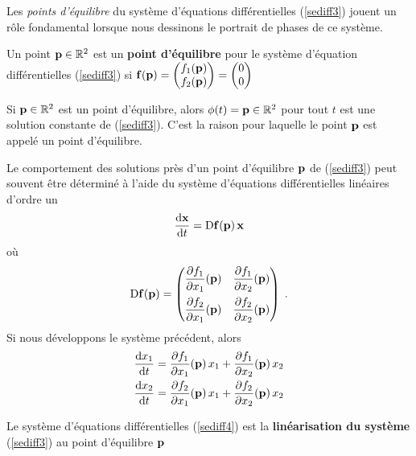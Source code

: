 {Les {\em points d'équilibre} du système d'équations différentielles
(\ref{sediff3}) jouent un rôle fondamental lorsque nous dessinons le
portrait de phases de ce système.

\begin{defn}
Un point $\mathbf{p} \in \mathbb{R}^2$ est un {\bfseries point
d'équilibre} pour le système d'équation différentielles (\ref{sediff3}) si
$\displaystyle \mathbf{f}(\mathbf{p}) =
\begin{pmatrix}
f_1(\mathbf{p}) \\ f_2(\mathbf{p})
\end{pmatrix} =
\begin{pmatrix}
0 \\ 0
\end{pmatrix}
$
\end{defn}

Si $\mathbf{p}\in \mathbb{R}^2$ est un point d'équilibre, alors
$\phi(t) = \mathbf{p} \in \mathbb{R}^2$ pour tout $t$ est une solution constante
de (\ref{sediff3}).  C'est la raison pour laquelle le point $\mathbf{p}$
est appelé un point d'équilibre.

Le comportement des solutions près d'un point d'équilibre $\mathbf{p}$ de
(\ref{sediff3}) peut souvent être déterminé à l'aide du
système d'équations différentielles linéaires d'ordre un
\begin{equation}\label{sediff4}
\frac{\mathrm{d}\mathbf{x}}{\mathrm{d}t} = \mathrm{D} \mathbf{f}(\mathbf{p}) \, \mathbf{x}
\end{equation}
où
\[
\mathrm{D} \mathbf{f}(\mathbf{p}) =
\begin{pmatrix}
\displaystyle \frac{\partial f_1}{\partial x_1}(\mathbf{p}) &
\displaystyle \frac{\partial f_1}{\partial x_2}(\mathbf{p}) \\[1em]
\displaystyle \frac{\partial f_2}{\partial x_1}(\mathbf{p}) &
\displaystyle \frac{\partial f_2}{\partial x_2}(\mathbf{p})
\end{pmatrix} \; .
\]
Si nous développons le système précédent, alors
\begin{align*}
\frac{\mathrm{d}x_1}{\mathrm{d}t} &= \frac{\partial f_1}{\partial x_1}(\mathbf{p})\,x_1 +
\frac{\partial f_1}{\partial x_2}(\mathbf{p})\,x_2 \\
\frac{\mathrm{d}x_2}{\mathrm{d}t} &= \frac{\partial f_2}{\partial x_1}(\mathbf{p})\,x_1 +
\frac{\partial f_2}{\partial x_2}(\mathbf{p})\,x_2 \\
\end{align*}

\begin{defn}
Le système d'équations différentielles (\ref{sediff4}) est la
{\bfseries linéarisation du système} (\ref{sediff3}) au point d'équilibre
$\mathbf{p}$
\end{defn}

}
